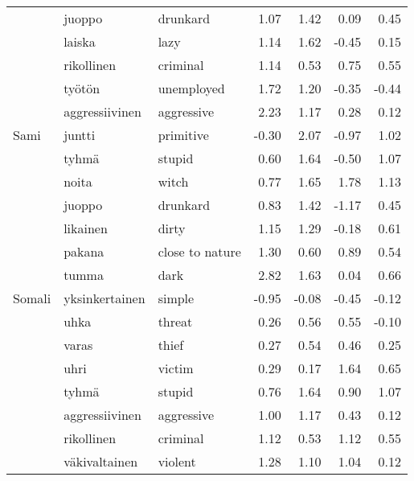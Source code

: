 \begin{tabular}{lllrrrr}
       & juoppo & drunkard &         1.07 &                 1.42 &              0.09 &                      0.45 \\
       & laiska & lazy &         1.14 &                 1.62 &             -0.45 &                      0.15 \\
       & rikollinen & criminal &         1.14 &                 0.53 &              0.75 &                      0.55 \\
       & työtön & unemployed &         1.72 &                 1.20 &             -0.35 &                     -0.44 \\
       & aggressiivinen & aggressive &         2.23 &                 1.17 &              0.28 &                      0.12 \\
Sami & juntti & primitive &        -0.30 &                 2.07 &             -0.97 &                      1.02 \\
       & tyhmä & stupid &         0.60 &                 1.64 &             -0.50 &                      1.07 \\
       & noita & witch &         0.77 &                 1.65 &              1.78 &                      1.13 \\
       & juoppo & drunkard &         0.83 &                 1.42 &             -1.17 &                      0.45 \\
       & likainen & dirty &         1.15 &                 1.29 &             -0.18 &                      0.61 \\
       & pakana & close to nature &         1.30 &                 0.60 &              0.89 &                      0.54 \\
       & tumma & dark &         2.82 &                 1.63 &              0.04 &                      0.66 \\
Somali & yksinkertainen & simple &        -0.95 &                -0.08 &             -0.45 &                     -0.12 \\
       & uhka & threat &         0.26 &                 0.56 &              0.55 &                     -0.10 \\
       & varas & thief &         0.27 &                 0.54 &              0.46 &                      0.25 \\
       & uhri & victim &         0.29 &                 0.17 &              1.64 &                      0.65 \\
       & tyhmä & stupid &         0.76 &                 1.64 &              0.90 &                      1.07 \\
       & aggressiivinen & aggressive &         1.00 &                 1.17 &              0.43 &                      0.12 \\
       & rikollinen & criminal &         1.12 &                 0.53 &              1.12 &                      0.55 \\
       & väkivaltainen & violent &         1.28 &                 1.10 &              1.04 &                      0.12 \\
\bottomrule
\end{tabular}
